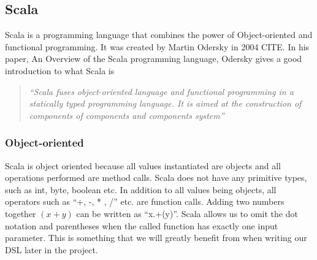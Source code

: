 \subsection{Scala}
\label{sec:scala}
Scala is a programming language that combines the power of Object-oriented and functional programming. It was created by Martin Odersky in 2004 CITE. In his paper, An Overview of the Scala programming language, Odersky gives a good introduction to what Scala is 
\begin{quote}
	\textit{``Scala fuses object-oriented language and functional programming in a statically typed programming language. It is aimed at the construction of components of components and components system''}
	\begin{flushright}
		\cite{odersky2004overview}
	\end{flushright}		
\end{quote}

\subsubsection{Object-oriented}
Scala is object oriented because all values instantiated are objects and all operations performed are method calls. Scala does not have any primitive types, such as int, byte, boolean etc. In addition to all values being objects, all operators such as ``+, -, * , /'' etc. are function calls. Adding two numbers together $(x + y)$ can be written as ``x.+(y)''. Scala allows us to omit the dot notation and parentheses when the called function has exactly one input parameter. This is something that we will greatly benefit from when writing our DSL later in the project.

